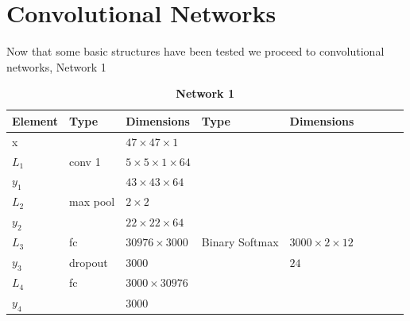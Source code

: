 
%
%
%
%
%
\section{Convolutional Networks}

Now that some basic structures have been tested we proceed to convolutional networks,
Network 1

\begin{table}[h!] \caption*{\textbf{Network 1}}
\centering
{\footnotesize
\begin{tabular}{|lllllllll|}
\hline
\multicolumn{1}{|l|}{Element} & Type     & \multicolumn{1}{l|}{Dimensions}                     & Type     & \multicolumn{1}{l|}{Dimensions}  \\ \hline
\multicolumn{1}{|l|}{x}       &          & \multicolumn{1}{l|}{$47\times47\times1$}            &          & \multicolumn{1}{l|}{}        \\ \hline
\multicolumn{1}{|l|}{$L_1$}   & conv 1   & \multicolumn{1}{l|}{$5\times 5\times1\times 64$}    &          & \multicolumn{1}{l|}{}\\
\multicolumn{1}{|l|}{$y_1$}   &          & \multicolumn{1}{l|}{$43\times43\times64$}           &          & \multicolumn{1}{l|}{}        \\ \hline
\multicolumn{1}{|l|}{$L_2$}   & max pool & \multicolumn{1}{l|}{$2\times 2$}                    &          & \multicolumn{1}{l|}{}        \\
\multicolumn{1}{|l|}{$y_2$}   &          & \multicolumn{1}{l|}{$22\times22\times 64$}          &          & \multicolumn{1}{l|}{}        \\ \hline
\multicolumn{1}{|l|}{$L_3$}   & fc       & \multicolumn{1}{l|}{$30976\times3000$}              & Binary Softmax & \multicolumn{1}{l|}{$3000\times2\times12$}        \\
\multicolumn{1}{|l|}{$y_3$}   & dropout  & \multicolumn{1}{l|}{$3000$}                         &          & \multicolumn{1}{l|}{$24$}        \\ \hline
\multicolumn{1}{|l|}{$L_4$}   & fc       & \multicolumn{1}{l|}{$3000\times30976$}              &          & \multicolumn{1}{l|}{}        \\
\multicolumn{1}{|l|}{$y_4$}   &          & \multicolumn{1}{l|}{$3000$}                         &          & \multicolumn{1}{l|}{}        \\ \hline

\end{tabular}}
\end{table}
